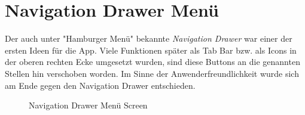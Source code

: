 \documentclass[
    DIV12,
    cleardouble=plain,
    headings=normal,
    pdftex,
    headexclude,footexclude,
    final
]{scrreprt}
\begin{document}
\section{Navigation Drawer Menü}
Der auch unter "Hamburger Menü" bekannte \textit{Navigation Drawer} war einer der ersten Ideen für die App. Viele Funktionen später als Tab Bar bzw. als Icons in der oberen rechten Ecke umgesetzt wurden, sind diese Buttons an die genannten Stellen hin verschoben worden. Im Sinne der Anwenderfreundlichkeit wurde sich am Ende gegen den Navigation Drawer entschieden.
\begin{figure}[H]
	\centering
	\caption{Navigation Drawer Menü Screen}
	\label{main_burger}
\end{figure}

\newpage
\end{document}
